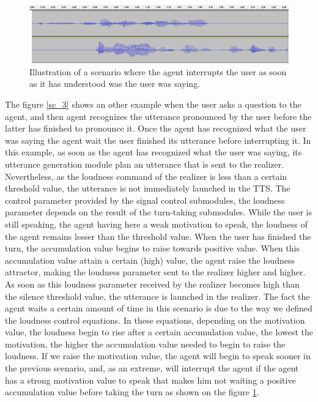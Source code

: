 \begin{figure}
\centering
\includegraphics[width=\linewidth]{figure/volume_transcript_2_1.png}
\caption{Illustration of a scenario where the agent interrupts the user as soon as it has understood was the user was saying.}
\label{sc_4}
\end{figure}

The figure \ref{sc_3} shows an other example when the user asks a question to the agent, and then agent recognizes the utterance pronounced by the user before the latter has finished to pronounce it. Once the agent has recognized what the user was saying the agent wait the user finished its utterance before interrupting it. In this example, as soon as the agent has recognized what the user was saying, its utterance generation module plan an utterance that is sent to the realizer. Nevertheless, as the loudness command of the realizer is less than a certain threshold value, the utterance is not immediately launched in the TTS. The control parameter provided by the signal control submodules, the loudness parameter depends on the result of the turn-taking submodules. While the user is still speaking, the agent having here a weak motivation to speak, the loudness of the agent remains lesser than the threshold value. When the user has finished the turn, the accumulation value begins to raise towards positive value. When this accumulation value attain a certain (high) value, the agent raise the loudness attractor, making the loudness parameter sent to the realizer higher and higher. As soon as this loudness parameter received by the realizer becomes high than the silence threshold value, the utterance is launched in the realizer.
The fact the agent waits a certain amount of time in this scenario is due to the way we defined the loudness control equations. In these equations, depending on the motivation value, the loudness begin to rise after a certain accumulation value, the lowest the motivation, the higher the accumulation value needed to begin to raise the loudness. If we raise the motivation value, the agent will begin to speak sooner in the previous scenario, and, as an extreme, will interrupt the agent if the agent has a strong motivation value to speak that makes him not waiting a positive accumulation value before taking the turn as shown on the figure \ref{sc_4}. 


